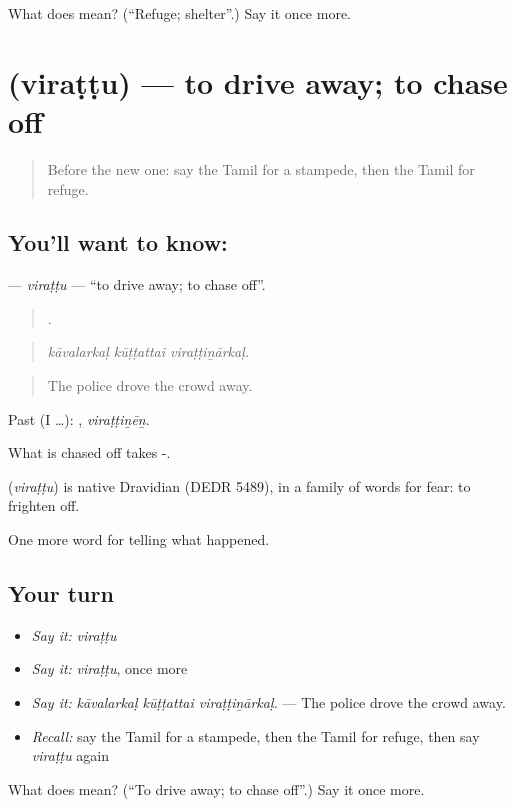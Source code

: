 \begin{tcolorbox}[breakable,colback=teal!4,colframe=teal!35!black,title={Before you move on}]
What does  mean? (\textquotedblleft{}Refuge; shelter\textquotedblright{}.) Say it once more.
\end{tcolorbox}
\section[\texorpdfstring{\ta{விரட்டு} (viraṭṭu)}{விரட்டு (viraṭṭu)}]{ (viraṭṭu) — to drive away; to chase off}

\label{lesson:TA-C303-virattu}



\begin{quote}
Before the new one: say the Tamil for a stampede, then the Tamil for refuge.
\end{quote}

\subsection*{You'll want to know: }
\textbf{} — \emph{viraṭṭu} — \textquotedblleft{}to drive away; to chase off\textquotedblright{}.

\begin{quote}
  .
\end{quote}

\begin{quote}
\emph{kāvalarkaḷ kūṭṭattai viraṭṭiṉārkaḷ.}
\end{quote}

\begin{quote}
The police drove the crowd away.
\end{quote}

Past (I …): , \emph{viraṭṭiṉēṉ}.

What is chased off takes -.

\begin{cousinweb}
\textbf{} (\emph{viraṭṭu}) is native Dravidian (DEDR 5489), in a family of words for fear: to frighten off.
\end{cousinweb}

\begin{grammarlens}[title={What you've built}]
One more word for telling what happened.
\end{grammarlens}

\subsection*{Your turn}
\begin{itemize}
\raggedright
  \item \emph{Say it:} \emph{viraṭṭu}
  \item \emph{Say it:} \emph{viraṭṭu}, once more
  \item \emph{Say it:} \emph{kāvalarkaḷ kūṭṭattai viraṭṭiṉārkaḷ.} — The police drove the crowd away.
  \item \emph{Recall:} say the Tamil for a stampede, then the Tamil for refuge, then say \emph{viraṭṭu} again
\end{itemize}

\begin{tcolorbox}[breakable,colback=teal!4,colframe=teal!35!black,title={Before you move on}]
What does  mean? (\textquotedblleft{}To drive away; to chase off\textquotedblright{}.) Say it once more.
\end{tcolorbox}
